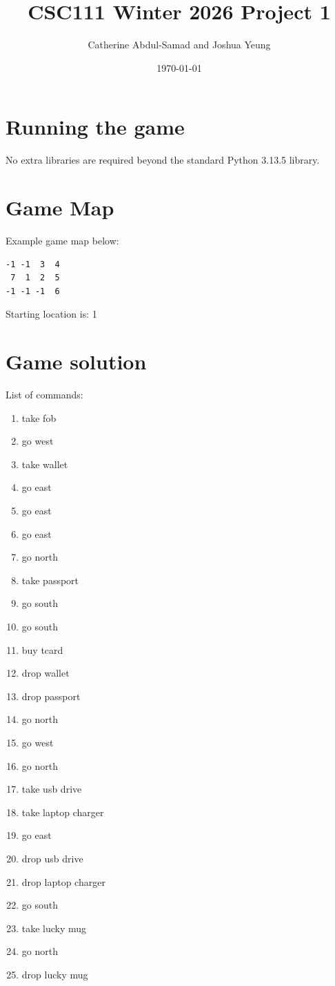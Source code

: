 \documentclass[11pt]{article}
\title{CSC111 Winter 2026 Project 1}
\author{Catherine Abdul-Samad and Joshua Yeung}
\date{\today}
\begin{document}
\maketitle

\section*{Running the game}
No extra libraries are required beyond the standard Python 3.13.5 library.

\section*{Game Map}
Example game map below:
\begin{verbatim}
-1 -1  3  4
 7  1  2  5
-1 -1 -1  6
\end{verbatim}

Starting location is: 1

\section*{Game solution}
List of commands:
\begin{enumerate}
    \item take fob
    \item go west
    \item take wallet
    \item go east
    \item go east
    \item go east
    \item go north
    \item take passport
    \item go south
    \item go south
    \item buy tcard
    \item drop wallet
    \item drop passport
    \item go north
    \item go west
    \item go north
    \item take usb drive
    \item take laptop charger
    \item go east
    \item drop usb drive
    \item drop laptop charger
    \item go south
    \item take lucky mug
    \item go north
    \item drop lucky mug
\end{enumerate}
\end{document}
